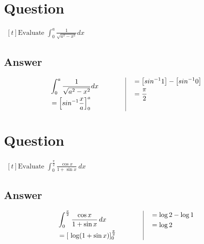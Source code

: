 \documentclass[17pt]{extarticle}
\begin{document}
\noindent
\begin{fleqn} 


\section{Question} 

$\begin{aligned}[t] 
\text{Evaluate \ } \int_{0}^{a} \frac{1}{\sqrt{a^2-x^2}}dx
\end{aligned}$

\subsection*{Answer}
\begin{equation} \nonumber
\begin{alignedat}{4}
& \int_{0}^{a} \frac{1}{\sqrt{a^2-x^2}}dx \\
&= \left[ sin^{-1}\frac{x}{a}\right]_{0}^{a}\\
\end{alignedat}
\quad \quad \quad \quad
\vrule
\quad
\begin{alignedat}{4}
&= \left[ sin^{-1}1\right] - \left[ sin^{-1}0\right]\\
&= \frac{\pi}{2}\\
&  \\
\end{alignedat}
\end{equation}

\section{Question} 

$\begin{aligned}[t] 
\text{Evaluate \ } \int_{0}^{\frac{\pi}{2}} \frac{\cos x}{1+\sin x}\ dx
\end{aligned}$

\subsection*{Answer}
\begin{equation} \nonumber
\begin{alignedat}{4}
& \int_{0}^{\frac{\pi}{2}} \frac{\cos x}{1 + \sin x}\,dx \\
&= \left[\  \log (1 + \sin x)\right]_{0}^{\frac{\pi}{2}}\\
\end{alignedat}
\quad \quad \quad \quad
\vrule
\quad
\begin{alignedat}{4}
&= \log 2 - \log 1\\
&= \log 2\\
&  \\
\end{alignedat}
\end{equation}


\end{fleqn}
\end{document}
